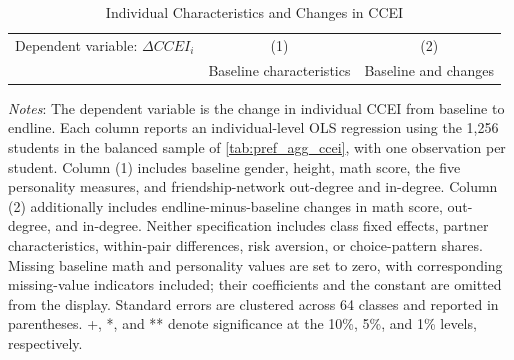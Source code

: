 \documentclass[11 pt]{article}
\renewcommand{\arraystretch}{1.2} %
\begin{document}
\begin{table}[H]
\centering
\singlespacing
\caption{Individual Characteristics and Changes in CCEI}
\label{tab:individual_ccei_change}
\small
\renewcommand{\arraystretch}{1.05}
\begin{tabular*}{0.9\textwidth}{@{\extracolsep{\fill}}lcc}
\toprule
Dependent variable: $\Delta CCEI_i$ & (1) & (2) \\
 & Baseline characteristics & Baseline and changes \\
\midrule

\end{tabular*}
\par\smallskip
\begin{minipage}{\textwidth}
\footnotesize
\emph{Notes}: The dependent variable is the change in individual CCEI from baseline to endline. Each column reports an individual-level OLS regression using the 1,256 students in the balanced sample of \autoref{tab:pref_agg_ccei}, with one observation per student. Column (1) includes baseline gender, height, math score, the five personality measures, and friendship-network out-degree and in-degree. Column (2) additionally includes endline-minus-baseline changes in math score, out-degree, and in-degree. Neither specification includes class fixed effects, partner characteristics, within-pair differences, risk aversion, or choice-pattern shares. Missing baseline math and personality values are set to zero, with corresponding missing-value indicators included; their coefficients and the constant are omitted from the display. Standard errors are clustered across 64 classes and reported in parentheses. +, *, and ** denote significance at the 10\%, 5\%, and 1\% levels, respectively.
\end{minipage}
\end{table}
\end{document}
